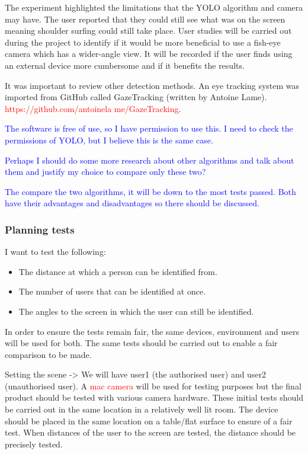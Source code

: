 \documentclass[12pt]{article}
\theoremstyle{plain}
\theoremstyle{definition}
\begin{document}
The experiment highlighted the limitations that the YOLO algorithm and camera may have. The user reported that they could still see what was on the screen meaning shoulder surfing could still take place. 
User studies will be carried out during the project to identify if it would be more beneficial to use a fish-eye camera which has a wider-angle view. It will be recorded if the user finds using an external device more cumbersome and if it benefits the results.


It was important to review other detection methods. An eye tracking system was imported from GitHub called GazeTracking (written by Antoine Lame). \textcolor{red}{https://github.com/antoinela me/GazeTracking}.


\textcolor{blue}{The software is free of use, so I have permission to use this. I need to check the permissions of YOLO, but I believe this is the same case.}

\textcolor{blue}{Perhaps I should do some more research about other algorithms and talk about them and justify my choice to compare only these two? }

\textcolor{blue}{The compare the two algorithms, it will be down to the most tests passed. Both have their advantages and disadvantages so there should be discussed.}

\subsubsection{Planning tests}
I want to test the following:
\begin{itemize}
    \item The distance at which a person can be identified from.
    \item The number of users that can be identified at once.
    \item The angles to the screen in which the user can still be identified.
\end{itemize}
In order to ensure the tests remain fair, the same devices, environment and users will be used for both. The same tests should be carried out to enable a fair comparison to be made.

Setting the scene -> We will have user1 (the authorised user) and user2 (unauthorised user). A \textcolor{red}{mac camera} will be used for testing purposes but the final product should be tested with various camera hardware. These initial tests should be carried out in the same location in a relatively well lit room. The device should be placed in the same location on a table/flat surface to ensure of a fair test. When distances of the user to the screen are tested, the distance should be precisely tested.
\end{document}
